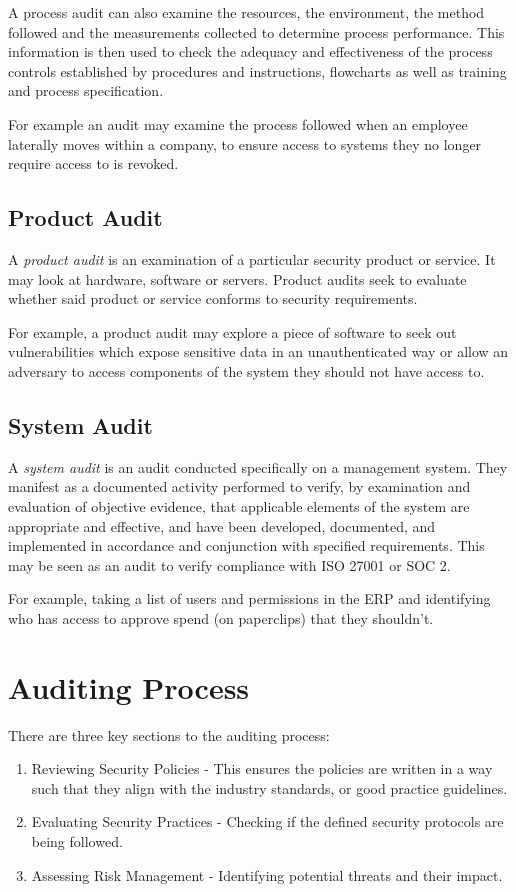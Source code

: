 A process audit can also examine the resources, the environment, the method followed and the measurements collected to determine process performance. This information is then used to check the adequacy and effectiveness of the process controls established by procedures and instructions, flowcharts as well as training and process specification.

For example an audit may examine the process followed when an employee laterally moves within a company, to ensure access to systems they no longer require access to is revoked.

\subsection{Product Audit}
A \textit{product audit} is an examination of a particular security product or service. It may look at hardware, software or servers. Product audits seek to evaluate whether said product or service conforms to security requirements.

For example, a product audit may explore a piece of software to seek out vulnerabilities which expose sensitive data in an unauthenticated way or allow an adversary to access components of the system they should not have access to.

\subsection{System Audit}
A \textit{system audit} is an audit conducted specifically on a management system. They manifest as a documented activity performed to verify, by examination and evaluation of objective evidence, that applicable elements of the system are appropriate and effective, and have been developed, documented, and implemented in accordance and conjunction with specified requirements. This may be seen as an audit to verify compliance with ISO 27001 or SOC 2.

For example, taking a list of users and permissions in the ERP and identifying who has access to approve spend (on paperclips) that they shouldn't.

\section{Auditing Process}
There are three key sections to the auditing process:
\begin{enumerate}
    \item Reviewing Security Policies - This ensures the policies are written in a way such that they align with the industry standards, or good practice guidelines.
    \item Evaluating Security Practices - Checking if the defined security protocols are being followed.
    \item Assessing Risk Management - Identifying potential threats and their impact.
\end{enumerate}

